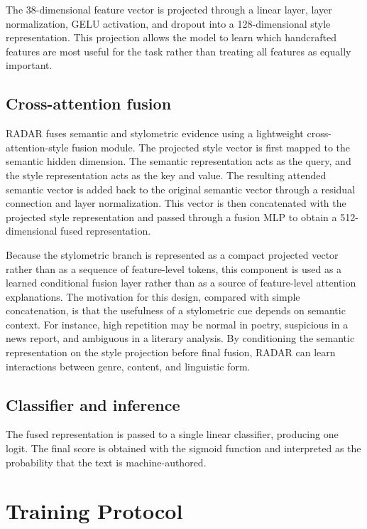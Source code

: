 \documentclass[]{ceurart}
\begin{document}
The 38-dimensional feature vector is projected through a linear layer, layer normalization, GELU activation, and dropout into a 128-dimensional style representation. This projection allows the model to learn which handcrafted features are most useful for the task rather than treating all features as equally important.

\subsection{Cross-attention fusion}

RADAR fuses semantic and stylometric evidence using a lightweight cross-attention-style fusion module. The projected style vector is first mapped to the semantic hidden dimension. The semantic representation acts as the query, and the style representation acts as the key and value. The resulting attended semantic vector is added back to the original semantic vector through a residual connection and layer normalization. This vector is then concatenated with the projected style representation and passed through a fusion MLP to obtain a 512-dimensional fused representation.

Because the stylometric branch is represented as a compact projected vector rather than as a sequence of feature-level tokens, this component is used as a learned conditional fusion layer rather than as a source of feature-level attention explanations. The motivation for this design, compared with simple concatenation, is that the usefulness of a stylometric cue depends on semantic context. For instance, high repetition may be normal in poetry, suspicious in a news report, and ambiguous in a literary analysis. By conditioning the semantic representation on the style projection before final fusion, RADAR can learn interactions between genre, content, and linguistic form.

\subsection{Classifier and inference}

The fused representation is passed to a single linear classifier, producing one logit. The final score is obtained with the sigmoid function and interpreted as the probability that the text is machine-authored.

\section{Training Protocol}
\end{document}
